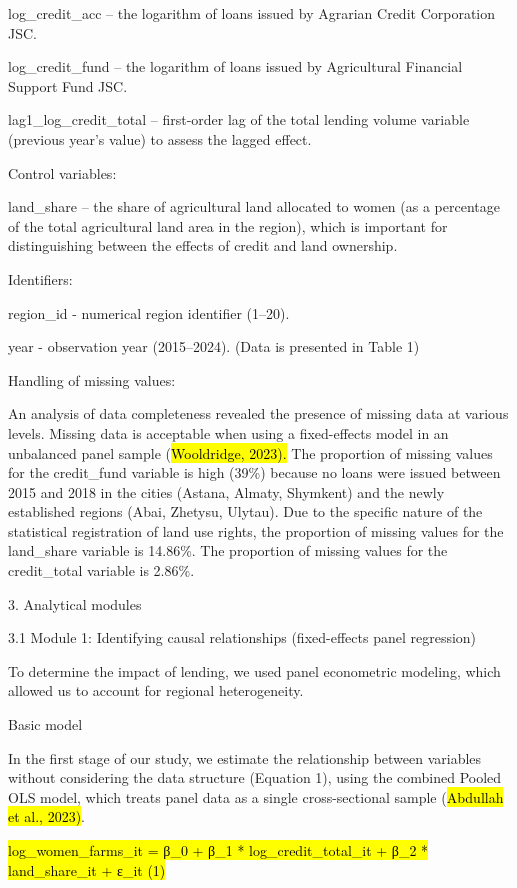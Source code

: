 log\_credit\_acc -- the logarithm of loans issued by Agrarian Credit
Corporation JSC.

log\_credit\_fund -- the logarithm of loans issued by Agricultural
Financial Support Fund JSC.

lag1\_log\_credit\_total -- first-order lag of the total lending volume
variable (previous year's value) to assess the lagged effect.

Control variables:

land\_share -- the share of agricultural land allocated to women (as a
percentage of the total agricultural land area in the region), which is
important for distinguishing between the effects of credit and land
ownership.

Identifiers:

region\_id - numerical region identifier (1--20).

year - observation year (2015--2024). (Data is presented in Table 1)

Handling of missing values:

An analysis of data completeness revealed the presence of missing data
at various levels. Missing data is acceptable when using a fixed-effects
model in an unbalanced panel sample (\hl{Wooldridge, 2023).} The
proportion of missing values for the credit\_fund variable is high
(39\%) because no loans were issued between 2015 and 2018 in the cities
(Astana, Almaty, Shymkent) and the newly established regions (Abai,
Zhetysu, Ulytau). Due to the specific nature of the statistical
registration of land use rights, the proportion of missing values for
the land\_share variable is 14.86\%. The proportion of missing values
for the credit\_total variable is 2.86\%.

3. Analytical modules

3.1 Module 1: Identifying causal relationships (fixed-effects panel
regression)

To determine the impact of lending, we used panel econometric modeling,
which allowed us to account for regional heterogeneity.

Basic model

In the first stage of our study, we estimate the relationship between
variables without considering the data structure (Equation 1), using the
combined Pooled OLS model, which treats panel data as a single
cross-sectional sample (\hl{Abdullah et al., 2023)}.

\hl{log\_women\_farms\_it = β\_0 + β\_1 * log\_credit\_total\_it + β\_2
* land\_share\_it + ε\_it (1)}


